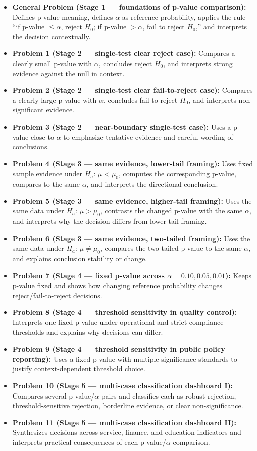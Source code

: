 \begin{itemize}
    \item \textbf{General Problem (Stage 1 --- foundations of p-value comparison):} Defines p-value meaning, defines \(\alpha\) as reference probability, applies the rule ``if p-value \(\le \alpha\), reject \(H_0\); if p-value \(>\alpha\), fail to reject \(H_0\),'' and interprets the decision contextually.
    \item \textbf{Problem 1 (Stage 2 --- single-test clear reject case):} Compares a clearly small p-value with \(\alpha\), concludes reject \(H_0\), and interprets strong evidence against the null in context.
    \item \textbf{Problem 2 (Stage 2 --- single-test clear fail-to-reject case):} Compares a clearly large p-value with \(\alpha\), concludes fail to reject \(H_0\), and interprets non-significant evidence.
    \item \textbf{Problem 3 (Stage 2 --- near-boundary single-test case):} Uses a p-value close to \(\alpha\) to emphasize tentative evidence and careful wording of conclusions.
    \item \textbf{Problem 4 (Stage 3 --- same evidence, lower-tail framing):} Uses fixed sample evidence under \(H_a\!:\,\mu<\mu_0\), computes the corresponding p-value, compares to the same \(\alpha\), and interprets the directional conclusion.
    \item \textbf{Problem 5 (Stage 3 --- same evidence, higher-tail framing):} Uses the same data under \(H_a\!:\,\mu>\mu_0\), contrasts the changed p-value with the same \(\alpha\), and interprets why the decision differs from lower-tail framing.
    \item \textbf{Problem 6 (Stage 3 --- same evidence, two-tailed framing):} Uses the same data under \(H_a\!:\,\mu\ne\mu_0\), compares the two-tailed p-value to the same \(\alpha\), and explains conclusion stability or change.
    \item \textbf{Problem 7 (Stage 4 --- fixed p-value across \(\alpha=0.10,0.05,0.01\)):} Keeps p-value fixed and shows how changing reference probability changes reject/fail-to-reject decisions.
    \item \textbf{Problem 8 (Stage 4 --- threshold sensitivity in quality control):} Interprets one fixed p-value under operational and strict compliance thresholds and explains why decisions can differ.
    \item \textbf{Problem 9 (Stage 4 --- threshold sensitivity in public policy reporting):} Uses a fixed p-value with multiple significance standards to justify context-dependent threshold choice.
    \item \textbf{Problem 10 (Stage 5 --- multi-case classification dashboard I):} Compares several p-value/\(\alpha\) pairs and classifies each as robust rejection, threshold-sensitive rejection, borderline evidence, or clear non-significance.
    \item \textbf{Problem 11 (Stage 5 --- multi-case classification dashboard II):} Synthesizes decisions across service, finance, and education indicators and interprets practical consequences of each p-value/\(\alpha\) comparison.
\end{itemize}


